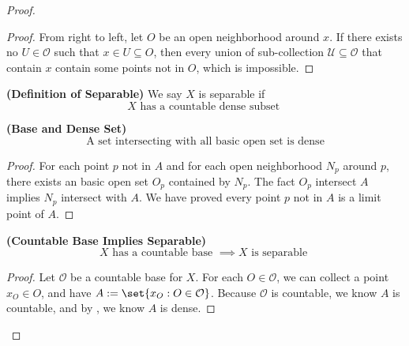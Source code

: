 \documentclass{report}
\begin{document}
\begin{proof}
\begin{proof}
  From right to left, let $O$ be an open neighborhood around $x$. If there exists no $U\in \mathcal{O}$ such that $x\in U\subseteq O$, then every union of sub-collection $\mathcal{U}\subseteq\mathcal{O}$ that contain $x$ contain some points not in  $O$, which is impossible.  
\end{proof}
\begin{definition}
\label{2.6.3}
\textbf{(Definition of Separable)} We say $X$ is separable if 
\begin{equation*}
  X\text{ has a countable dense subset }
\end{equation*}
\end{definition}
\begin{theorem}
\label{2.6.4}
\textbf{(Base and Dense Set)} 
\begin{equation*}
\text{ A set intersecting with all basic open set is dense }
\end{equation*}
\end{theorem}
\begin{proof}
For each point $p$ not in $A$ and for each open neighborhood $N_p$ around $p$, there exists an basic open set  $O_p$ contained by $N_p$. The fact  $O_p$ intersect $A$ implies  $N_p$ intersect with  $A$. We have proved every point  $p$ not in $A $ is a limit point of $A$.
\end{proof}
\begin{corollary}
\label{2.6.5}
\textbf{(Countable Base Implies Separable)} 
\begin{equation*}
X\text{ has a countable base }\implies X\text{ is separable }
\end{equation*}
\end{corollary}
\begin{proof}
Let $\mathcal{O}$ be a countable base for $X$. For each $O\in \mathcal{O}$, we can collect a point $x_O\in O$, and have $A:=\set{x_O:O\in \mathcal{O}}$. Because $\mathcal{O}$ is countable, we know $A$ is countable, and by  , we know $A$ is dense.
\end{proof}
\end{proof}
\end{document}
